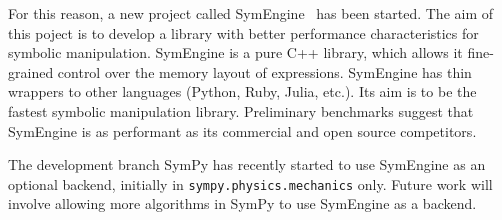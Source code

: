 For this reason, a new project called SymEngine~\cite{SymEngine} has been started.
The aim of this poject is to develop a library with better performance
characteristics for symbolic manipulation. SymEngine is a pure C++ library,
which allows it fine-grained control over the memory layout of expressions.
SymEngine has thin wrappers to other languages (Python, Ruby,
Julia, etc.). Its aim is to be the fastest symbolic manipulation library. Preliminary
benchmarks suggest that SymEngine is as performant as its commercial and
open source competitors.

The development branch SymPy has recently started to use SymEngine as an
optional backend, initially in \texttt{sympy.\allowbreak{}physics.\allowbreak{}mechanics} only.
Future work will involve
allowing more algorithms in SymPy to use SymEngine as a backend.
